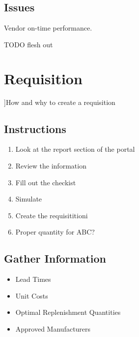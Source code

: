 \documentclass[letterpaper,10pt,english]{sphinxmanual}
\begin{document}
\subsection{Issues}
\label{\detokenize{450-MultipleLeadTimes2:issues}}
Vendor on-time performance.

TODO flesh out


\section{Requisition}
\label{\detokenize{750-Requisitions:requisition}}\label{\detokenize{750-Requisitions::doc}}
{]}How and why to create a requisition


\subsection{Instructions}
\label{\detokenize{750-Requisitions:instructions}}\begin{enumerate}
%
\item {} 
Look at the report section of the portal

\item {} 
Review the information

\item {} 
Fill out the checkist

\item {} 
Simulate

\item {} 
Create the requisititioni

\item {} 
Proper quantity for ABC?

\end{enumerate}


\subsection{Gather Information}
\label{\detokenize{750-Requisitions:gather-information}}\begin{itemize}
\item {} 
Lead Times

\item {} 
Unit Costs

\item {} 
Optimal Replenishment Quantities

\item {} 
Approved Manufacturers

\end{itemize}
\end{document}
